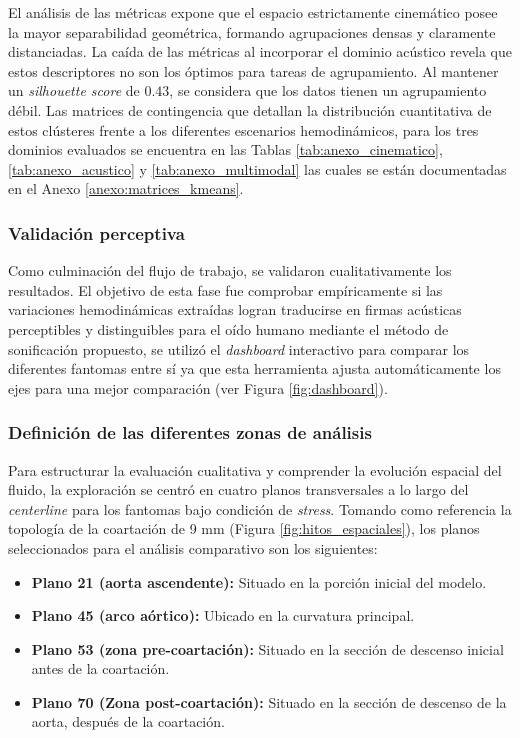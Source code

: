 El análisis de las métricas expone que el espacio estrictamente cinemático posee la mayor separabilidad geométrica, formando agrupaciones densas y claramente distanciadas. La caída de las métricas al incorporar el dominio acústico revela que estos descriptores no son los óptimos para tareas de agrupamiento. Al mantener un \textit{silhouette score} de $0.43$, se considera que los datos tienen un agrupamiento débil. Las matrices de contingencia que detallan la distribución cuantitativa de estos clústeres frente a los diferentes escenarios hemodinámicos, para los tres dominios evaluados se encuentra en las Tablas \ref{tab:anexo_cinematico}, \ref{tab:anexo_acustico} y \ref{tab:anexo_multimodal} las cuales se están documentadas en el Anexo \ref{anexo:matrices_kmeans}. 

\subsubsection{Validación perceptiva}

Como culminación del flujo de trabajo, se validaron cualitativamente los resultados. El objetivo de esta fase fue comprobar empíricamente si las variaciones hemodinámicas extraídas logran traducirse en firmas acústicas perceptibles y distinguibles para el oído humano mediante el método de sonificación propuesto, se utilizó el \textit{dashboard} interactivo para comparar los diferentes fantomas entre sí ya que esta herramienta ajusta automáticamente los ejes para una mejor comparación (ver Figura \ref{fig:dashboard}).

\subsubsection{Definición de las diferentes zonas de análisis}

Para estructurar la evaluación cualitativa y comprender la evolución espacial del fluido, la exploración se centró en cuatro planos transversales a lo largo del \textit{centerline} para los fantomas bajo condición de \textit{stress}. Tomando como referencia la topología de la coartación de 9 mm (Figura \ref{fig:hitos_espaciales}), los planos seleccionados para el análisis comparativo son los siguientes:

\begin{itemize}
    \item \textbf{Plano 21 (aorta ascendente):} Situado en la porción inicial del modelo.

    \item \textbf{Plano 45 (arco aórtico):} Ubicado en la curvatura principal.

    \item \textbf{Plano 53 (zona pre-coartación):} Situado en la sección de descenso inicial antes de la coartación.

    \item \textbf{Plano 70 (Zona post-coartación):} Situado en la sección de descenso de la aorta, después de la coartación.
\end{itemize}

